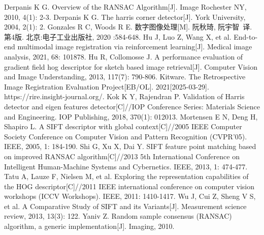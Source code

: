 \documentclass[a4paper, utf8]{ctexart}
\begin{document}
	\begin{thebibliography}{99}
		 Derpanis K G. Overview of the RANSAC Algorithm[J]. Image Rochester NY, 2010, 4(1): 2-3.
		 Derpanis K G. The harris corner detector[J]. York University, 2004, 2(1): 2.
		 Gonzales R C, Woods R E. 数字图像处理[M]. 阮秋琦, 阮宇智\ 译. 第4版. 北京:电子工业出版社, 2020 :584-648.
		 Hu J, Luo Z, Wang X, et al. End-to-end multimodal image registration via reinforcement learning[J]. Medical image analysis, 2021, 68: 101878.
		 Hu R, Collomosse J. A performance evaluation of gradient field hog descriptor for sketch based image retrieval[J]. Computer Vision and Image Understanding, 2013, 117(7): 790-806.
		 Kitware. The Retrospective Image Registration Evaluation Project[EB/OL]. 2021[2025-03-29]. https://rire.insight-journal.org/.
		 Kok K Y, Rajendran P. Validation of Harris detector and eigen features detector[C]//IOP Conference Series: Materials Science and Engineering. IOP Publishing, 2018, 370(1): 012013.
		 Mortensen E N, Deng H, Shapiro L. A SIFT descriptor with global context[C]//2005 IEEE Computer Society Conference on Computer Vision and Pattern Recognition (CVPR'05). IEEE, 2005, 1: 184-190.
		 Shi G, Xu X, Dai Y. SIFT feature point matching based on improved RANSAC algorithm[C]//2013 5th International Conference on Intelligent Human-Machine Systems and Cybernetics. IEEE, 2013, 1: 474-477.
		 Tatu A, Lauze F, Nielsen M, et al. Exploring the representation capabilities of the HOG descriptor[C]//2011 IEEE international conference on computer vision workshops (ICCV Workshops). IEEE, 2011: 1410-1417.
		 Wu J, Cui Z, Sheng V S, et al. A Comparative Study of SIFT and its Variants[J]. Measurement science review, 2013, 13(3): 122.
		 Yaniv Z. Random sample consensus (RANSAC) algorithm, a generic implementation[J]. Imaging, 2010.
	\end{thebibliography}
	
\end{document}
